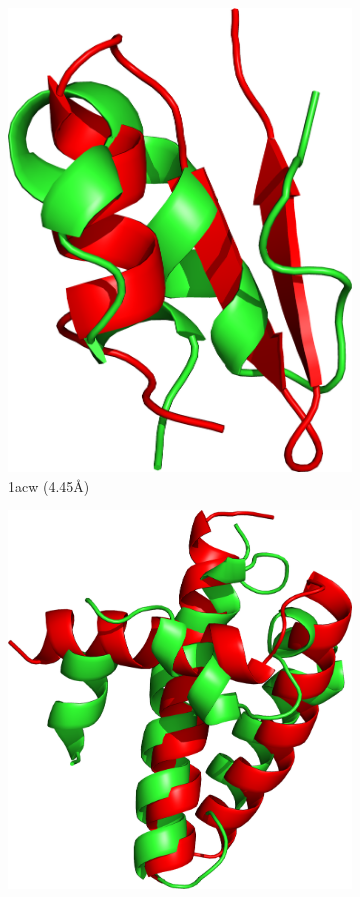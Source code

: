 \begin{figure}
  \begin{subfigure}{0.24\linewidth}
    \centering
    \includegraphics[width=0.9\linewidth]{Figuras/prots/1acw_render.png}
    \caption{1acw (4.45\AA)}
    \label{fig:1acw-conformation}
  \end{subfigure}
%
  \begin{subfigure}{0.24\linewidth}
    \centering
    \includegraphics[width=0.9\linewidth]{Figuras/prots/1ail_render.png}

\end{subfigure}
\end{figure}

